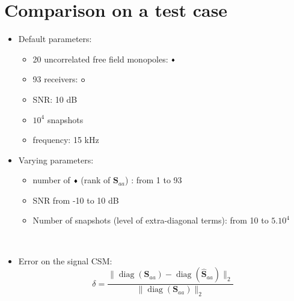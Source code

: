\documentclass[9pt,xcolor=x11names,compress, notes=show]{beamer}%
\newcommand{\diag}[1]{\operatorname{diag}\left(#1\right)}
\begin{document}
\section{Comparison on a test case}
\begin{frame}{\insertsectionhead}
	
	\begin{itemize}
	\item Default parameters:
		\noindent\begin{minipage}{\linewidth}
		     	\begin{minipage}{0.4\linewidth}		     		
	         			\begin{itemize}
					\item 20  uncorrelated free field monopoles: \textcolor{red}{$\vcenter{\hbox{\tiny$\blacklozenge$}}$}
					\item 93 receivers: \textcolor{colorAlice}{$\vcenter{\hbox{\small$\bm{\circ}$}}$}
					\item SNR: 10 dB
					\item $10^4$ snapshots
					\item frequency: 15 kHz
				\end{itemize}	
	               		\vfill
	     		\end{minipage}
	      		\hfill
	     		 \begin{minipage}{0.5\linewidth}
             			\centering
             			\vspace{-0.5cm}
				
	      		\end{minipage}
		\end{minipage}
	
	\item Varying parameters: \\
	\begin{itemize}
	        \item number of   \textcolor{red}{$\vcenter{\hbox{\tiny$\blacklozenge$}}$} (rank of $\bm{S}_{aa}$) : from 1 to 93\\[3pt]
	        \item SNR from -10 to 10 dB\\[3pt]
	        \item Number of snapshots (level of extra-diagonal terms): from 10 to $5.10^4$
\end{itemize}~\\	
	
	\item Error on the signal CSM:
	\begin{equation*}
   		 \delta = \frac{\|\diag{\bm{S}_{aa}}  - \diag{\bm{\hat{S}}_{aa}}\|_2}{\|\diag{\bm{S}_{aa} } \|_2}
	\end{equation*}
	\end{itemize}

\end{frame}
\end{document}
